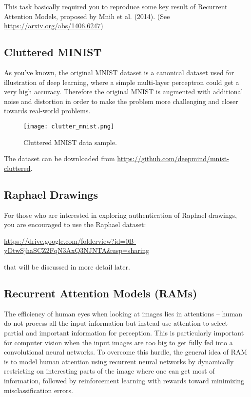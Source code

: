 \documentclass[11pt]{article}
\begin{document}
This task basically required you to reproduce some key result of Recurrent Attention Models, proposed by Mnih et al. (2014). (See \url{https://arxiv.org/abs/1406.6247})

\subsection{Cluttered MINIST}

As you've known, the original MNIST dataset is a canonical dataset used for illustration of deep learning, where a simple multi-layer perceptron could get a very high accuracy. Therefore the original MNIST is augmented with additional noise and distortion in order to make the problem more challenging and closer towards real-world problems. 

\begin{figure}[h]
\center
\texttt{[image: clutter\_mnist.png]}  
\caption{Cluttered MNIST data sample.} 
\label{fig:cmnist}
\end{figure}

The dataset can be downloaded from \url{https://github.com/deepmind/mnist-cluttered}.

\subsection{Raphael Drawings}
For those who are interested in exploring authentication of Raphael drawings, you are encouraged to use the Raphael dataset:

\url{https://drive.google.com/folderview?id=0B-yDtwSjhaSCZ2FqN3AxQ3NJNTA&usp=sharing}

\noindent that will be discussed in more detail later. 

\subsection{Recurrent Attention Models (RAMs)}

The efficiency of human eyes when looking at images lies in attentions -- human do not process all the input information but instead use attention to select partial and important information for perception. This is particularly important for computer vision when the input images are too big to get fully fed into a convolutional neural networks. To overcome this hurdle, the general idea of RAM is to model human attention using recurrent neural networks by dynamically restricting on interesting parts of the image where one can get most of information, followed by reinforcement learning with rewards toward minimizing misclassification errors. 
\end{document}
